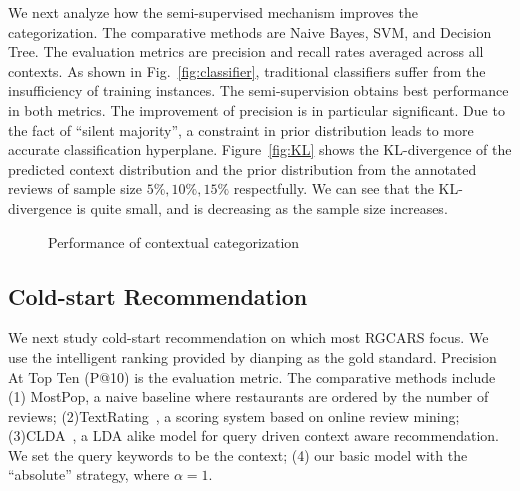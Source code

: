 \documentclass[sigconf]{acmart}
\begin{document}
We next analyze how the semi-supervised mechanism improves the categorization. The comparative methods are Naive Bayes, SVM, and Decision Tree. The evaluation metrics are precision and recall rates averaged across all contexts. As shown in Fig.~\ref{fig:classifier}, traditional classifiers suffer from the insufficiency of training instances. The semi-supervision obtains best performance in both metrics. The improvement of precision is in particular significant. Due to the fact of ``silent majority'', a constraint in prior distribution leads to more accurate classification hyperplane. Figure~\ref{fig:KL} shows the KL-divergence of the predicted context distribution and the prior distribution from the annotated reviews of sample size $5\%,10\%,15\%$ respectfully. We can see that the KL-divergence is quite small, and is decreasing as the sample size increases.
\begin{figure}
\centering
{}
\caption{Performance of contextual categorization}
\end{figure}

\subsection{Cold-start Recommendation}

We next study cold-start recommendation on which most RGCARS focus. We use the intelligent ranking provided by dianping as the gold standard. Precision At Top Ten (P@10) is the evaluation metric. The comparative methods include (1) MostPop, a naive baseline where restaurants are ordered by the number of reviews; (2)TextRating~\cite{Levi2012Finding}, a scoring system based on online review mining; (3)CLDA~\cite{Hariri2013Query}, a LDA alike model for query driven context aware recommendation. We set the query keywords to be the context; (4) our basic model with the ``absolute'' strategy, where $\alpha=1$.
\end{document}
